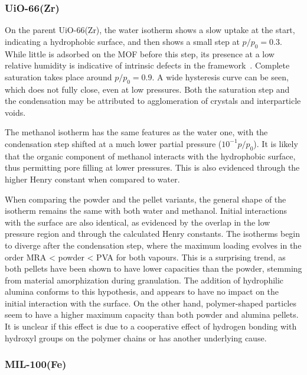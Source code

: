 \subsubsection{UiO-66(Zr)}

On the parent UiO-66(Zr), the water isotherm shows a slow uptake 
at the start, indicating a hydrophobic surface, and then shows 
a small step at \(p/p_0 = 0.3\). While little is 
adsorbed on the \gls{MOF} before this step, its presence 
at a low relative humidity is indicative of intrinsic defects
in the framework~\cite{ghoshWaterAdsorptionUiO662014}.
Complete saturation takes place around \(p/p_0 = 0.9\). 
A wide hysteresis curve can be seen, which 
does not fully close, even at low pressures. Both the
saturation step and the condensation may be attributed 
to agglomeration of crystals and interparticle voids.

The methanol isotherm has the same features as the water
one, with the condensation step shifted at a much lower 
partial pressure (\(10^{-1} p/p_0\)). It is likely that
the organic component of methanol interacts with the
hydrophobic surface, thus permitting pore filling at
lower pressures. This is also evidenced through the higher
Henry constant when compared to water.

When comparing the powder and the pellet variants, the 
general shape of the isotherm remains the same with both
water and methanol. Initial interactions with the surface are also
identical, as evidenced by the overlap in the low pressure region
and through the calculated Henry constants. The isotherms 
begin to diverge after the condensation step, where the 
maximum loading evolves in the order \gls{MRA} < powder < \gls{PVA}
for both vapours. This is a surprising trend, as both pellets
have been shown to have lower capacities than the powder,
stemming from material amorphization during granulation.
The addition of hydrophilic alumina conforms to this hypothesis,
and appears to have no impact on the initial interaction with 
the surface. On the other hand, polymer-shaped particles
seem to have a higher maximum capacity than both powder and 
alumina pellets. It is unclear if this effect is due to a 
cooperative effect of hydrogen bonding with hydroxyl groups 
on the polymer chains or has another underlying cause.

\subsubsection{MIL-100(Fe)}

